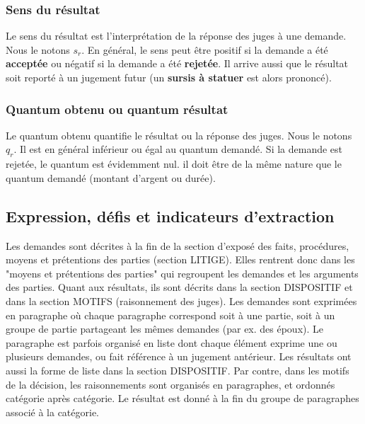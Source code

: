 \subsubsection{Sens du résultat}
Le sens du résultat est l'interprétation de la réponse des juges à une demande. Nous le notons $s_r$. En général, le sens peut être positif si la demande a été \textbf{acceptée} ou négatif si la demande a été \textbf{rejetée}. Il arrive aussi que le résultat soit reporté à un jugement futur (un \textbf{sursis à statuer} est alors prononcé). 

\subsubsection{Quantum obtenu ou quantum résultat}
Le quantum obtenu quantifie le résultat ou la réponse des juges. Nous le notons $q_r$. Il est en général inférieur ou égal au quantum demandé. Si la demande est rejetée, le quantum est évidemment nul. il doit être de la même nature que le quantum demandé (montant d'argent ou durée).

\subsection{Expression, défis et indicateurs d'extraction}
Les demandes sont décrites à la fin de la section d'exposé des faits, procédures, moyens et prétentions des parties (section LITIGE). Elles rentrent donc dans les "moyens et prétentions des parties" qui regroupent les demandes et les arguments des parties. Quant aux résultats, ils sont décrits dans la section DISPOSITIF et dans la section MOTIFS (raisonnement des juges). Les demandes sont exprimées en paragraphe où chaque paragraphe correspond soit à une partie, soit à un groupe de partie partageant les mêmes demandes (par ex. des époux). Le paragraphe est parfois organisé en liste dont chaque élément exprime une ou plusieurs demandes, ou fait référence à un jugement antérieur. Les résultats ont aussi la forme de liste dans la section DISPOSITIF. Par contre, dans les motifs de la décision, les raisonnements sont organisés en paragraphes, et ordonnés catégorie après catégorie. Le résultat est donné à la fin du groupe de paragraphes associé à la catégorie.

